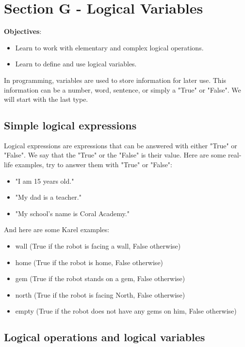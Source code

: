 \documentclass[article,A4,12pt]{llncs}
\begin{document}
\section{Section G - Logical Variables}

\noindent
{\bf Objectives}: 
\begin{itemize}
\item Learn to work with elementary and complex logical operations.
\item Learn to define and use logical variables.
\end{itemize}

\noindent
In programming, variables are used to store information for later use. This information can 
be a number, word, sentence, or simply a "True" or "False". We will start
with the last type. 

\subsection{Simple logical expressions}
Logical expressions are expressions that can be answered with either "True" or 
"False". We say that the "True" or the "False" is their value. Here are some 
real-life examples, try to answer them with "True" or "False":

\begin{itemize}
\item "I am 15 years old."
\item "My dad is a teacher."
\item "My school's name is Coral Academy."
\end{itemize}
And here are some Karel examples:
\begin{itemize}
\item wall (True if the robot is facing a wall, False otherwise)
\item home (True if the robot is home, False otherwise)
\item gem (True if the robot stands on a gem, False otherwise)
\item north (True if the robot is facing North, False otherwise)
\item empty (True if the robot does not have any gems on him, False otherwise)
\end{itemize}

\subsection{Logical operations and logical variables}
\end{document}
